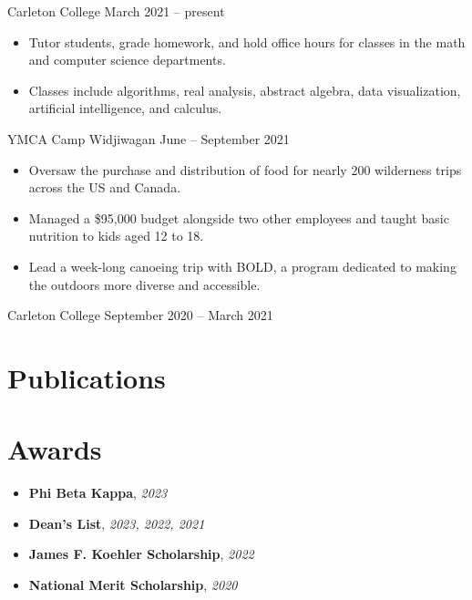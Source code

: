 \documentclass{ali-resume}
\begin{document}
{Carleton College}
{March 2021 -- present}

\begin{itemize}
	\item Tutor students, grade homework, and hold office hours for classes in the math and computer science departments.
	\item Classes include
	      algorithms, %
	      real analysis, %
	      abstract algebra, %
	      data visualization, %
	      artificial intelligence, %
	      and calculus. %
\end{itemize}

{YMCA Camp Widjiwagan}
{June -- September 2021}

\begin{itemize}
	\item Oversaw the purchase and distribution of food for nearly 200 wilderness trips across the US and Canada.
	\item Managed a \$95,000 budget alongside two other employees and taught basic nutrition to kids aged 12 to 18.
	\item Lead a week-long canoeing trip with BOLD, a program dedicated to making the outdoors more diverse and accessible.
\end{itemize}

{Carleton College}
{September 2020 -- March 2021}



\null

\section{Publications}


\section{Awards}

\newcommand{\award}[2]{\textbf{#1}, \textit{#2}}

\begin{itemize}[label={}, leftmargin=0em]
	\item \award{Phi Beta Kappa}{2023}
	\item \award{Dean's List}{2023, 2022, 2021}
	\item \award{James F. Koehler Scholarship}{2022}
	\item \award{National Merit Scholarship}{2020}
\end{itemize}
\end{document}
